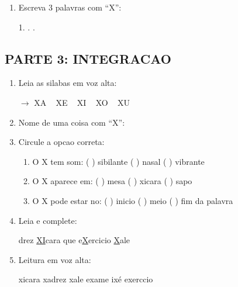 \begin{exercicio}
\begin{enumerate}[resume]
  \item Escreva 3 palavras com ``X'':
  \begin{center}
  1. \underline{\hspace{4cm}} . \underline{\hspace{4cm}} . \underline{\hspace{4cm}}
  \end{center}
\end{enumerate}

\subsection*{PARTE 3: INTEGRACAO}

\begin{enumerate}[resume]
  \item Leia as silabas em voz alta:
  \begin{center}
  $\rightarrow$ XA  ~  XE  ~  XI  ~  XO  ~  XU
  \end{center}

  \item Nome de uma coisa com ``X'':
  \begin{center}
  \underline{\hspace{6cm}}
  \end{center}

  \item Circule a opcao correta:
  \begin{enumerate}[label=(\alph*)]
    \item O X tem som: ( ) sibilante ( ) nasal ( ) vibrante
    \item O X aparece em: ( ) mesa ( ) xicara ( ) sapo
    \item O X pode estar no: ( ) inicio ( ) meio ( ) fim da palavra
  \end{enumerate}

  \item Leia e complete:
  \begin{center}
  drez \quad \underline{XI}cara \quad {}que \quad e\underline{X}ercicio \quad \underline{X}ale
  \end{center}

  \item Leitura em voz alta:
  \begin{center}
  xicara \quad xadrez \quad xale \quad exame \quad ixé \quad exerccio
  \end{center}
\end{enumerate}
\end{exercicio}


